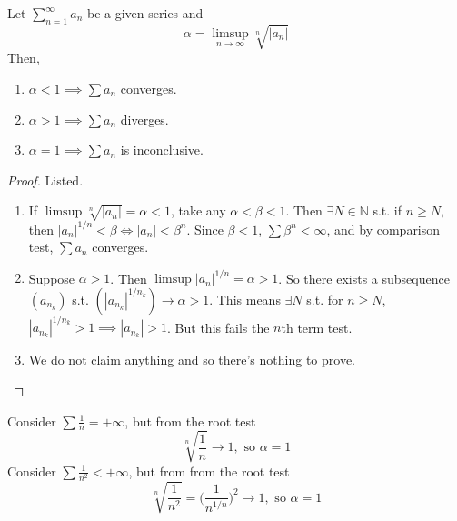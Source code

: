   \begin{theorem}
    \label{thm:root-test}
    Let $\sum_{n=1}^\infty a_n$ be a given series and 
    \begin{equation}
      \alpha = \limsup_{n\rightarrow \infty} \sqrt[n]{|a_n|}
    \end{equation}
    Then, 
    \begin{enumerate}
      \item $\alpha < 1 \implies \sum a_n$ converges. 
      \item $\alpha > 1 \implies \sum a_n$ diverges. 
      \item $\alpha = 1 \implies \sum a_n$ is inconclusive. 
    \end{enumerate}
  \end{theorem} 
  \begin{proof}
    Listed. 
    \begin{enumerate}
      \item If $\limsup \sqrt[n]{|a_n|} = \alpha < 1$, take any $\alpha < \beta < 1$. Then $\exists N \in \mathbb{N}$ s.t. if $n \geq N$, then $|a_n|^{1/n} < \beta \iff |a_n| < \beta^n$. Since $\beta < 1$, $\sum \beta^n < \infty$, and by comparison test, $\sum a_n$ converges. 

      \item Suppose $\alpha > 1$. Then $\limsup |a_n|^{1/n} = \alpha > 1$. So there exists a subsequence $(a_{n_k})$ s.t. $(|a_{n_k}|^{1/n_k}) \rightarrow \alpha > 1$. This means $\exists N$ s.t. for $n \geq N$, $|a_{n_k}|^{1/{n_k}} > 1 \implies |a_{n_k}| > 1$. But this fails the $n$th term test. 

      \item We do not claim anything and so there's nothing to prove. 
    \end{enumerate}
  \end{proof}

  \begin{example}
    \label{ex:root-test-inconclusive-results}
    Consider $\sum \frac{1}{n} = +\infty$, but from the root test 
    \begin{equation}
      \sqrt[n]{\frac{1}{n}} \rightarrow 1, \text{ so } \alpha = 1
    \end{equation}
    Consider $\sum \frac{1}{n^2} < +\infty$, but from from the root test 
    \begin{equation}
      \sqrt[n]{\frac{1}{n^2}} = \bigg( \frac{1}{n^{1/n}} \bigg)^2 \rightarrow 1, \text{ so } \alpha = 1
    \end{equation}
  \end{example}

